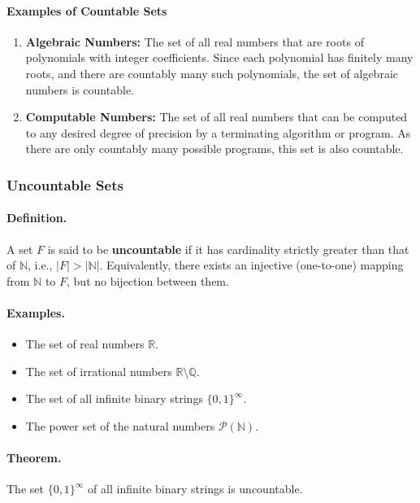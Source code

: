 \paragraph{Examples of Countable Sets}
\begin{enumerate}
    \item \textbf{Algebraic Numbers:} The set of all real numbers that are roots of polynomials with integer coefficients. Since each polynomial has finitely many roots, and there are countably many such polynomials, the set of algebraic numbers is countable.
    \item \textbf{Computable Numbers:} The set of all real numbers that can be computed to any desired degree of precision by a terminating algorithm or program. As there are only countably many possible programs, this set is also countable.
\end{enumerate}

\subsubsection{Uncountable Sets}

\paragraph{Definition.}
A set $F$ is said to be \textbf{uncountable} if it has cardinality strictly greater than that of $\mathbb{N}$, i.e., $|F| > |\mathbb{N}|$.  
Equivalently, there exists an injective (one-to-one) mapping from $\mathbb{N}$ to $F$, but no bijection between them.

\paragraph{Examples.}
\begin{itemize}
    \item The set of real numbers $\mathbb{R}$.
    \item The set of irrational numbers $\mathbb{R} \setminus \mathbb{Q}$.
    \item The set of all infinite binary strings $\{0,1\}^{\infty}$.
    \item The power set of the natural numbers $\mathcal{P}(\mathbb{N})$.
\end{itemize}

\paragraph{Theorem.}
The set $\{0,1\}^{\infty}$ of all infinite binary strings is uncountable.

